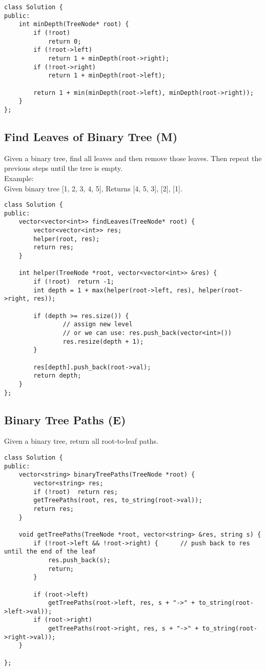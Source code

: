 \begin{lstlisting}
class Solution {
public:
    int minDepth(TreeNode* root) {
        if (!root) 
            return 0;
        if (!root->left) 
            return 1 + minDepth(root->right);
        if (!root->right) 
            return 1 + minDepth(root->left);
            
        return 1 + min(minDepth(root->left), minDepth(root->right));
    }
};
\end{lstlisting}


\subsection{Find Leaves of Binary Tree (M)}
Given a binary tree, find all leaves and then remove those leaves. Then repeat the previous steps until the tree is empty.\\

Example:\\
Given binary tree [1, 2, 3, 4, 5], Returns [4, 5, 3], [2], [1].\\

\begin{lstlisting}
class Solution {
public:
    vector<vector<int>> findLeaves(TreeNode* root) {
        vector<vector<int>> res;
        helper(root, res);
        return res;
    }
    
    int helper(TreeNode *root, vector<vector<int>> &res) {
        if (!root)  return -1;
        int depth = 1 + max(helper(root->left, res), helper(root->right, res));
        
        if (depth >= res.size()) {
                // assign new level
                // or we can use: res.push_back(vector<int>())
        		res.resize(depth + 1);
        }
        
        res[depth].push_back(root->val);
        return depth;
    }
};
\end{lstlisting}


\subsection{Binary Tree Paths (E)}
Given a binary tree, return all root-to-leaf paths. \\

\begin{lstlisting}
class Solution {
public:
    vector<string> binaryTreePaths(TreeNode *root) {
        vector<string> res;
        if (!root)  return res;
        getTreePaths(root, res, to_string(root->val));
        return res;
    }
    
    void getTreePaths(TreeNode *root, vector<string> &res, string s) {
        if (!root->left && !root->right) {      // push back to res until the end of the leaf
            res.push_back(s);
            return;
        }
        
        if (root->left)
            getTreePaths(root->left, res, s + "->" + to_string(root->left->val));
        if (root->right)
            getTreePaths(root->right, res, s + "->" + to_string(root->right->val));
    }
    
};
\end{lstlisting}


